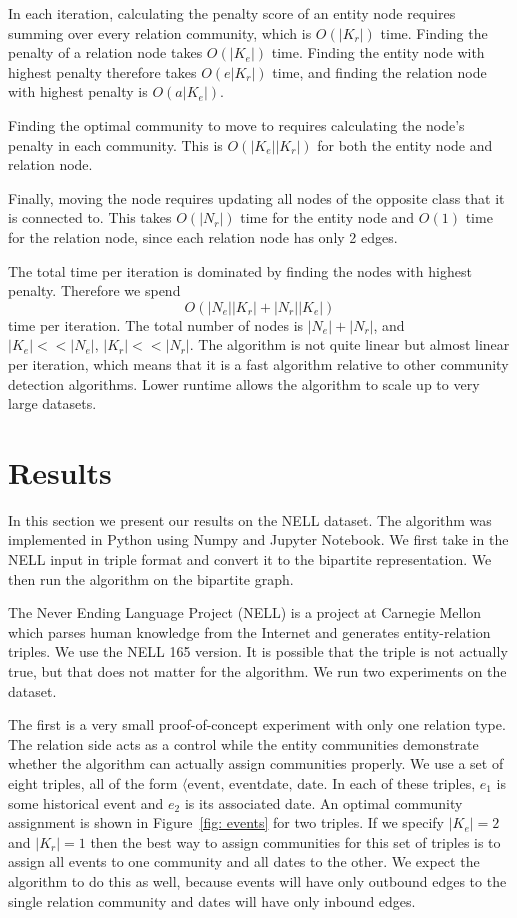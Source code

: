 \documentclass[12pt]{article}
\begin{document}
In each iteration, calculating the penalty score of an entity node requires summing
over every relation community, which is $O(|K_r|)$ time. Finding the penalty of
a relation node takes $O(|K_e|)$ time. Finding the entity node with highest
penalty therefore takes $O(e|K_r|)$ time, and finding the relation node with
highest penalty is $O(a|K_e|)$.

Finding the optimal community to move to requires calculating the node's penalty
in each community. This is $O(|K_e||K_r|)$ for both the entity node and relation
node.

Finally, moving the node requires updating all nodes of the opposite class that
it is connected to. This takes $O(|N_r|)$ time for the entity node and $O(1)$ time
for the relation node, since each relation node has only 2 edges.

The total time per iteration is dominated by finding the nodes with highest
penalty. Therefore we spend $$O(|N_e||K_r| + |N_r||K_e|)$$ time per iteration.
The total number of nodes is $|N_e| + |N_r|$, and $|K_e| << |N_e|,\,|K_r| << |N_r|$.
The algorithm is not quite linear but almost linear per iteration, which means
that it is a fast algorithm relative to other community detection algorithms.
Lower runtime allows the algorithm to scale up to very large datasets.

\section{Results}
\label{Results}

In this section we present our results on the NELL dataset\cite{Carlson2010}.
The algorithm was implemented in Python using Numpy\cite{Jones2001} and Jupyter
Notebook\cite{Perez2007}. We first take in the NELL input in triple format and
convert it to the bipartite representation. We then run the algorithm on the
bipartite graph.

The Never Ending Language Project (NELL) is a project at Carnegie Mellon which
parses human knowledge from the Internet and generates entity-relation triples.
We use the NELL 165 version. It is possible that the triple is not actually
true, but that does not matter for the algorithm. We run two experiments on the
dataset.

The first is a very small proof-of-concept experiment with only one relation
type. The relation side acts as a control while the entity communities
demonstrate whether the algorithm can actually assign communities properly. We
use a set of eight triples, all of the form $\langle \text{event},
\,\text{eventdate}, \,\text{date}$. In each of these triples, $e_1$ is some
historical event and $e_2$ is its associated date. An optimal community
assignment is shown in Figure~\ref{fig: events} for two triples. If we specify
$|K_e| = 2$ and $|K_r|=1$ then the best way to assign communities for this set of
triples is to assign all events to one community and all dates to the other. We
expect the algorithm to do this as well, because events will have only outbound
edges to the single relation community and dates will have only inbound edges.
\end{document}
